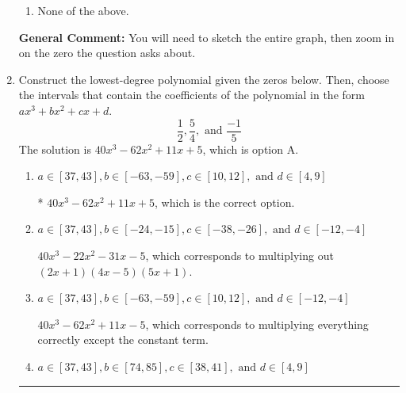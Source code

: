 \documentclass{extbook}[14pt]
\newcommand{\litem}[1]{\item #1

\rule{\textwidth}{0.4pt}}
\begin{document}
\begin{enumerate}
{\begin{enumerate}[label=\Alph*.]
\item None of the above.\end{enumerate}
\textbf{General Comment:} You will need to sketch the entire graph, then zoom in on the zero the question asks about.
}
\litem{
Construct the lowest-degree polynomial given the zeros below. Then, choose the intervals that contain the coefficients of the polynomial in the form $ax^3+bx^2+cx+d$.
\[ \frac{1}{2}, \frac{5}{4}, \text{ and } \frac{-1}{5} \]The solution is \( 40x^{3} -62 x^{2} +11 x + 5 \), which is option A.\begin{enumerate}[label=\Alph*.]
\item \( a \in [37, 43], b \in [-63, -59], c \in [10, 12], \text{ and } d \in [4, 9] \)

* $40x^{3} -62 x^{2} +11 x + 5$, which is the correct option.
\item \( a \in [37, 43], b \in [-24, -15], c \in [-38, -26], \text{ and } d \in [-12, -4] \)

$40x^{3} -22 x^{2} -31 x -5$, which corresponds to multiplying out $(2x + 1)(4x -5)(5x + 1)$.
\item \( a \in [37, 43], b \in [-63, -59], c \in [10, 12], \text{ and } d \in [-12, -4] \)

$40x^{3} -62 x^{2} +11 x -5$, which corresponds to multiplying everything correctly except the constant term.
\item \( a \in [37, 43], b \in [74, 85], c \in [38, 41], \text{ and } d \in [4, 9] \)


\end{enumerate}}
\end{enumerate}
\end{document}
